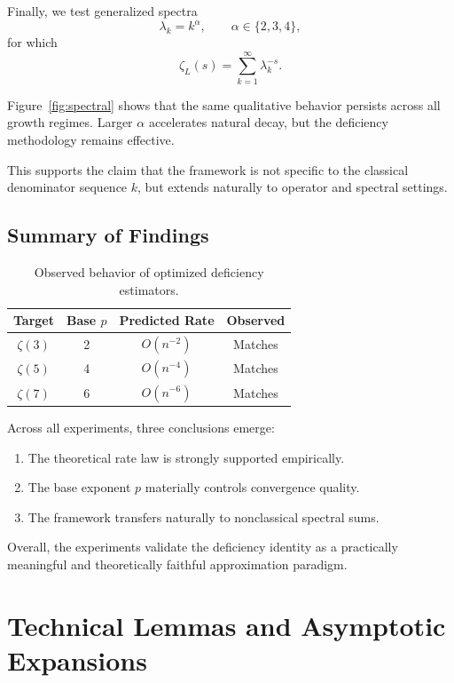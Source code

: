 \documentclass[11pt]{article}
\numberwithin{equation}{section}
\theoremstyle{definition}
\begin{document}
Finally, we test generalized spectra
\[
\lambda_k=k^\alpha,\qquad \alpha\in\{2,3,4\},
\]
for which
\[
\zeta_L(s)=\sum_{k=1}^{\infty}\lambda_k^{-s}.
\]

Figure~\ref{fig:spectral} shows that the same qualitative behavior persists across all growth regimes. Larger \(\alpha\) accelerates natural decay, but the deficiency methodology remains effective.

This supports the claim that the framework is not specific to the classical denominator sequence \(k\), but extends naturally to operator and spectral settings.

\subsection{Summary of Findings}

\begin{table}[t]
\centering
\caption{Observed behavior of optimized deficiency estimators.}
\label{tab:rates}
\begin{tabular}{cccc}
\toprule
Target & Base \(p\) & Predicted Rate & Observed \\
\midrule
\(\zeta(3)\) & 2 & \(O(n^{-2})\) & Matches \\
\(\zeta(5)\) & 4 & \(O(n^{-4})\) & Matches \\
\(\zeta(7)\) & 6 & \(O(n^{-6})\) & Matches \\
\bottomrule
\end{tabular}
\end{table}

Across all experiments, three conclusions emerge:

\begin{enumerate}[leftmargin=18pt]
\item The theoretical rate law is strongly supported empirically.
\item The base exponent \(p\) materially controls convergence quality.
\item The framework transfers naturally to nonclassical spectral sums.
\end{enumerate}

Overall, the experiments validate the deficiency identity as a practically meaningful and theoretically faithful approximation paradigm.





\appendix


\section{Technical Lemmas and Asymptotic Expansions}
\end{document}
